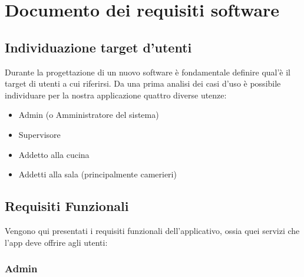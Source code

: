\section{Documento dei requisiti software}
        \subsection{Individuazione target d'utenti}
                \begin{flushleft}
                Durante la progettazione di un nuovo software è
                fondamentale definire qual'è il target di utenti a cui riferirsi. Da una
                prima analisi dei casi d'uso è possibile individuare per la nostra applicazione
                quattro diverse utenze:
                        \begin{itemize}
                                \item Admin (o Amministratore del sistema)
                                \item Supervisore
                                \item Addetto alla cucina
                                \item Addetti alla sala (principalmente camerieri)
                        \end{itemize}
                \end{flushleft}

    \subsection{Requisiti Funzionali}
        \begin{flushleft}  
            {\large
                Vengono qui presentati i requisiti funzionali dell'applicativo, ossia quei servizi che l'app  deve offrire agli utenti:
            } 
        \end{flushleft}
        
        \subsubsection{Admin}
        

